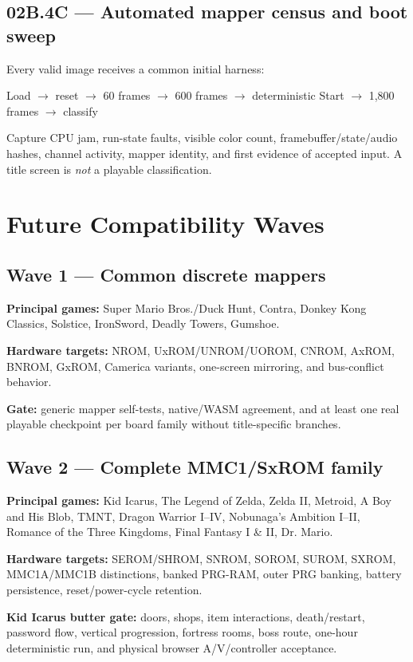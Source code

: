 \documentclass[10pt,letterpaper]{article}
\begin{document}
\subsection{02B.4C --- Automated mapper census and boot sweep}
Every valid image receives a common initial harness:

\begin{center}
Load $\rightarrow$ reset $\rightarrow$ 60 frames $\rightarrow$ 600 frames $\rightarrow$ deterministic Start $\rightarrow$ 1,800 frames $\rightarrow$ classify
\end{center}

Capture CPU jam, run-state faults, visible color count, framebuffer/state/audio hashes, channel activity, mapper identity, and first evidence of accepted input. A title screen is \emph{not} a playable classification.

\section{Future Compatibility Waves}

\subsection{Wave 1 --- Common discrete mappers}
\textbf{Principal games:} Super Mario Bros./Duck Hunt, Contra, Donkey Kong Classics, Solstice, IronSword, Deadly Towers, Gumshoe.

\textbf{Hardware targets:} NROM, UxROM/UNROM/UOROM, CNROM, AxROM, BNROM, GxROM, Camerica variants, one-screen mirroring, and bus-conflict behavior.

\textbf{Gate:} generic mapper self-tests, native/WASM agreement, and at least one real playable checkpoint per board family without title-specific branches.

\subsection{Wave 2 --- Complete MMC1/SxROM family}
\textbf{Principal games:} Kid Icarus, The Legend of Zelda, Zelda II, Metroid, A Boy and His Blob, TMNT, Dragon Warrior I--IV, Nobunaga's Ambition I--II, Romance of the Three Kingdoms, Final Fantasy I \& II, Dr. Mario.

\textbf{Hardware targets:} SEROM/SHROM, SNROM, SOROM, SUROM, SXROM, MMC1A/MMC1B distinctions, banked PRG-RAM, outer PRG banking, battery persistence, reset/power-cycle retention.

\textbf{Kid Icarus butter gate:} doors, shops, item interactions, death/restart, password flow, vertical progression, fortress rooms, boss route, one-hour deterministic run, and physical browser A/V/controller acceptance.
\end{document}
